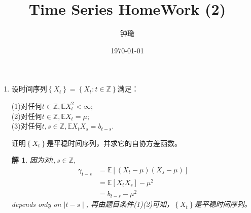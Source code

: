 \documentclass[11pt,a4paper]{ctexart}
\title{Time Series HomeWork (2)}
\author{钟瑜 \quad 222018314210044}
\date{\today}
\newtheorem*{solution}{解}
\begin{document}
\maketitle
\pagestyle{plain}%
\begin{enumerate}
	
\item[1.]设时间序列$\left\lbrace  X_t\right\rbrace=\left\lbrace X_t:t\in\mathbb{Z}\right\rbrace$满足：

(1)对任何$t\in\mathbb{Z},\mathbb{E}X_t^2<\infty$;\\
(2)对任何$t\in\mathbb{Z},\mathbb{E}X_t=\mu$;\\
(3)对任何$t,s\in\mathbb{Z},\mathbb{E}X_tX_s=b_{t-s}$.

证明$\left\lbrace  X_t\right\rbrace$是平稳时间序列，并求它的自协方差函数。
\begin{solution}	
	因为对$t,s\in\mathbb{Z}$,
	\begin{equation}
	\begin{aligned}
	\gamma_{t-s}&=\mathbb{E}[(X_t-\mu)(X_s-\mu)]\\
	&=\mathbb{E}[X_tX_s]-\mu^2\\
	&=b_{t-s}-\mu^2
	\end{aligned}
	\end{equation}
depends only on $\mid t-s\mid$, 再由题目条件(1)(2)可知，$\left\lbrace  X_t\right\rbrace$是平稳时间序列。
\end{solution}
\end{enumerate}
\end{document}

